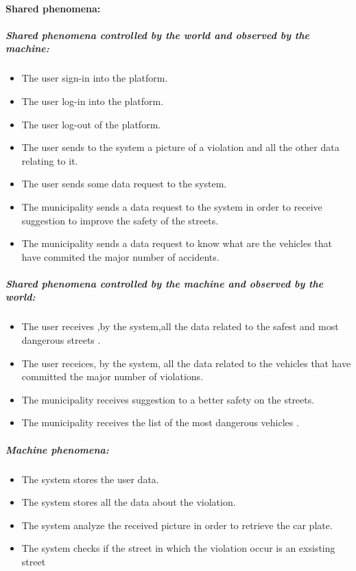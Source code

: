 \documentclass[titlepage]{article}
\begin{document}
\paragraph{Shared phenomena: }
\subparagraph{Shared phenomena controlled by the world and observed by the machine: }
\begin{itemize}
    \item The user sign-in into the platform.
    \item The user log-in into the platform.
    \item The user log-out of the platform.
 	\item The user sends to the system a picture of a            	violation and all the other data relating to it.
 	\item The user sends some data request to the system.
	\item The municipality sends a data request to the system 		  in order to receive suggestion to improve the 				  safety 	of the streets.
	\item The municipality sends a data request to know what 			  are the vehicles that have commited the major 				  number of accidents.
\end{itemize}
\subparagraph{Shared phenomena controlled by the machine and  			observed by the world: }
\begin{itemize}
	\item The user receives ,by the system,all the data 			related to the safest and most dangerous streets .
	\item The user receices, by the system, all the data related to the vehicles that have committed the major number of violations.
	\item The municipality receives suggestion to a better 			safety on the streets.
	\item The municipality receives the list of the most 			dangerous vehicles .
	
\end{itemize}
\subparagraph{Machine phenomena: }
\begin{itemize}
	\item The system stores the user data.
	\item The system stores all the data about the violation.
	\item The system analyze the received picture in order to 	retrieve the car plate.
	\item The system checks if the street in which the 				violation occur is an exsisting street
\end{itemize}
\end{document}
